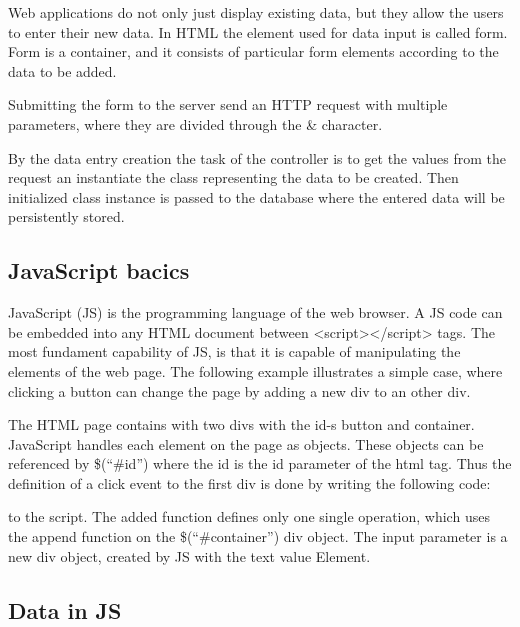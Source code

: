 Web applications do not only just display existing data, but they allow the users to enter their new data. In HTML the element used for data input is called form. Form is a container, and it consists of particular form elements according to the data to be added. 


Submitting the form to the server send an HTTP request with multiple parameters, where they are divided through the \& character.


By the data entry creation the task of the controller is to get the values from the request an instantiate the class representing the data to be created. Then initialized class instance is passed to the database where the entered data will be persistently stored.



\subsection{JavaScript bacics}

JavaScript (JS) is the programming language of the web browser. A JS code can be embedded into any HTML document between <script></script> tags. The most fundament capability of JS, is that it is capable of manipulating the elements of the web page. The following example illustrates a simple case, where clicking a button can change the page by adding a new div to an other div.


The HTML page contains with two divs with the id-s button and container. JavaScript handles each element on the page as objects. These objects can be referenced by \$(“\#id”) where the id is the id parameter of the html tag. Thus the definition of a click event to the first div is done by writing the following code:


to the script. The added function defines only one single operation, which uses the append function on the \$(“\#container”) div object. The input parameter is a new div object, created by JS with the text value Element. 


\subsection{Data in JS}

